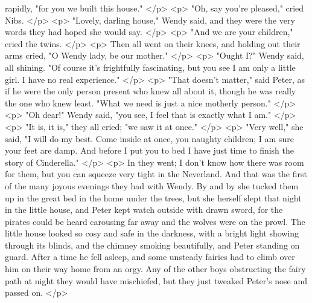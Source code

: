       rapidly, "for you we built this house."
    </p>
    <p>
      "Oh, say you're pleased," cried Nibs.
    </p>
    <p>
      "Lovely, darling house," Wendy said, and they were the very words they had
      hoped she would say.
    </p>
    <p>
      "And we are your children," cried the twins.
    </p>
    <p>
      Then all went on their knees, and holding out their arms cried, "O Wendy
      lady, be our mother."
    </p>
    <p>
      "Ought I?" Wendy said, all shining. "Of course it's frightfully
      fascinating, but you see I am only a little girl. I have no real
      experience."
    </p>
    <p>
      "That doesn't matter," said Peter, as if he were the only person present
      who knew all about it, though he was really the one who knew least. "What
      we need is just a nice motherly person."
    </p>
    <p>
      "Oh dear!" Wendy said, "you see, I feel that is exactly what I am."
    </p>
    <p>
      "It is, it is," they all cried; "we saw it at once."
    </p>
    <p>
      "Very well," she said, "I will do my best. Come inside at once, you
      naughty children; I am sure your feet are damp. And before I put you to
      bed I have just time to finish the story of Cinderella."
    </p>
    <p>
      In they went; I don't know how there was room for them, but you can
      squeeze very tight in the Neverland. And that was the first of the many
      joyous evenings they had with Wendy. By and by she tucked them up in the
      great bed in the home under the trees, but she herself slept that night in
      the little house, and Peter kept watch outside with drawn sword, for the
      pirates could be heard carousing far away and the wolves were on the
      prowl. The little house looked so cosy and safe in the darkness, with a
      bright light showing through its blinds, and the chimney smoking
      beautifully, and Peter standing on guard. After a time he fell asleep, and
      some unsteady fairies had to climb over him on their way home from an
      orgy. Any of the other boys obstructing the fairy path at night they would
      have mischiefed, but they just tweaked Peter's nose and passed on.
    </p>

